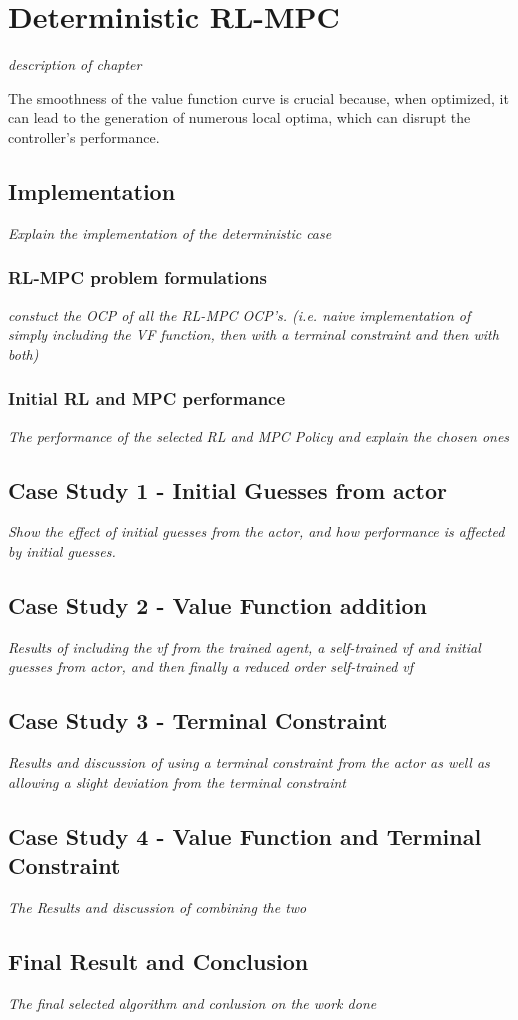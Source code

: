 \chapter{Deterministic RL-MPC}
\label{chapter:deterministic_RL_MPC}

\emph{description of chapter}


The smoothness of the value function curve is crucial because, when optimized, it can lead to the generation of numerous local optima, which can disrupt the controller's performance.


\section{Implementation}
\emph{Explain the implementation of the deterministic case}
\subsection{RL-MPC problem formulations}

\emph{constuct the OCP of all the RL-MPC OCP's. (i.e. naive implementation of simply including the VF function, then with a terminal constraint and then with both)}
\subsection{Initial RL and MPC performance}
\emph{The performance of the selected RL and MPC Policy and explain the chosen ones}

\section{Case Study 1 - Initial Guesses from actor}
\emph{Show the effect of initial guesses from the actor, and how performance is affected by initial guesses.}

\section{Case Study 2 - Value Function addition}
\emph{Results of including the vf from the trained agent, a self-trained vf and initial guesses from actor, and then finally a reduced order self-trained vf}

\section{Case Study 3 - Terminal Constraint}
\emph{Results and discussion of using a terminal constraint from the actor as well as allowing a slight deviation from the terminal constraint}

\section{Case Study 4 - Value Function and Terminal Constraint}
\emph{The Results and discussion of combining the two}

\section{Final Result and Conclusion}
\emph{The final selected algorithm and conlusion on the work done}

